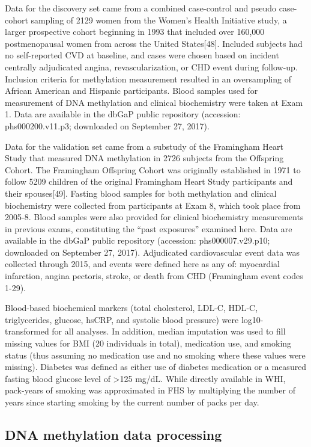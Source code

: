\documentclass[]{bmcart}
\theoremstyle{definition}
\theoremstyle{definition}
\theoremstyle{definition}
\theoremstyle{remark}
\begin{document}
Data for the discovery set came from a combined case-control and pseudo
case-cohort sampling of 2129 women from the Women's Health Initiative
study, a larger prospective cohort beginning in 1993 that included over
160,000 postmenopausal women from across the United States{[}48{]}.
Included subjects had no self-reported CVD at baseline, and cases were
chosen based on incident centrally adjudicated angina,
revascularization, or CHD event during follow-up. Inclusion criteria for
methylation measurement resulted in an oversampling of African American
and Hispanic participants. Blood samples used for measurement of DNA
methylation and clinical biochemistry were taken at Exam 1. Data are
available in the dbGaP public repository (accession: phs000200.v11.p3;
downloaded on September 27, 2017).

Data for the validation set came from a substudy of the Framingham Heart
Study that measured DNA methylation in 2726 subjects from the Offspring
Cohort. The Framingham Offspring Cohort was originally established in
1971 to follow 5209 children of the original Framingham Heart Study
participants and their spouses{[}49{]}. Fasting blood samples for both
methylation and clinical biochemistry were collected from participants
at Exam 8, which took place from 2005-8. Blood samples were also
provided for clinical biochemistry measurements in previous exams,
constituting the ``past exposures'' examined here. Data are available in
the dbGaP public repository (accession: phs000007.v29.p10; downloaded on
September 27, 2017). Adjudicated cardiovascular event data was collected
through 2015, and events were defined here as any of: myocardial
infarction, angina pectoris, stroke, or death from CHD (Framingham event
codes 1-29).

Blood-based biochemical markers (total cholesterol, LDL-C, HDL-C,
triglycerides, glucose, hsCRP, and systolic blood pressure) were
log10-transformed for all analyses. In addition, median imputation was
used to fill missing values for BMI (20 individuals in total),
medication use, and smoking status (thus assuming no medication use and
no smoking where these values were missing). Diabetes was defined as
either use of diabetes medication or a measured fasting blood glucose
level of \textgreater{}125 mg/dL. While directly available in WHI,
pack-years of smoking was approximated in FHS by multiplying the number
of years since starting smoking by the current number of packs per day.

\subsection{DNA methylation data
processing}\label{dna-methylation-data-processing}
\end{document}
